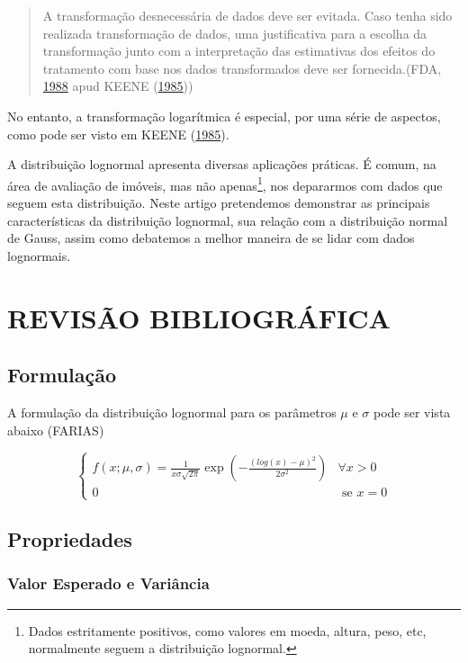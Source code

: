 \documentclass[a4paper]{article}
\let\rmarkdownfootnote\footnote%
\def\footnote{\protect\rmarkdownfootnote}
\begin{document}
\begin{quote}
A transformação desnecessária de dados deve ser evitada. Caso tenha sido
realizada transformação de dados, uma justificativa para a escolha da
transformação junto com a interpretação das estimativas dos efeitos do
tratamento com base nos dados transformados deve ser fornecida.(FDA,
\protect\hyperlink{ref-fda}{1988} apud KEENE
(\protect\hyperlink{ref-keene}{1985}))
\end{quote}

No entanto, a transformação logarítmica é especial, por uma série de
aspectos, como pode ser visto em KEENE
(\protect\hyperlink{ref-keene}{1985}).

A distribuição lognormal apresenta diversas aplicações práticas. É
comum, na área de avaliação de imóveis, mas não apenas\footnote{Dados
  estritamente positivos, como valores em moeda, altura, peso, etc,
  normalmente seguem a distribuição lognormal.}, nos depararmos com
dados que seguem esta distribuição. Neste artigo pretendemos demonstrar
as principais características da distribuição lognormal, sua relação com
a distribuição normal de Gauss, assim como debatemos a melhor maneira de
se lidar com dados lognormais.

\section{REVISÃO BIBLIOGRÁFICA}\label{revisao-bibliografica}

\subsection{Formulação}\label{formulacao}

A formulação da distribuição lognormal para os parâmetros \(\mu\) e
\(\sigma\) pode ser vista abaixo (FARIAS)

\[\begin{cases}
f(x;\mu, \sigma) = \frac{1}{x\sigma\sqrt{2\pi}}\exp(-\frac{(log(x) - \mu)^2}{2\sigma^2}) & \forall x > 0 \\ 
0 & \text{ se } x = 0 
\end{cases}\]

\subsection{Propriedades}\label{propriedades}

\subsubsection{Valor Esperado e
Variância}\label{valor-esperado-e-variancia}
\end{document}
